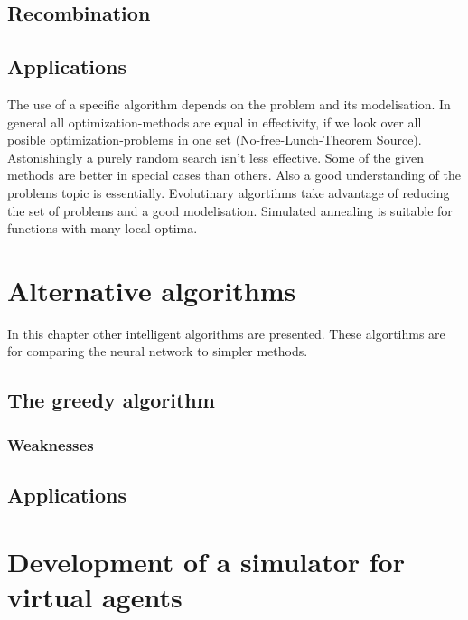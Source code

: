 \documentclass[10pt,a4paper,DIV=11]{scrreprt}
\begin{document}
\section{Recombination}



\section{Applications}
The use of a specific algorithm depends on the problem and its modelisation. In general all optimization-methods are equal in effectivity, if we look over all posible optimization-problems in one set (No-free-Lunch-Theorem Source). Astonishingly a purely random search isn't less effective.
Some of the given methods are better in special cases than others. Also a good understanding of the problems topic is essentially. Evolutinary algortihms take advantage of reducing the set of problems and a good modelisation.
Simulated annealing is suitable for functions with many local optima.


\chapter{Alternative algorithms}
In this chapter other intelligent algorithms are presented.
These algortihms are for comparing the neural network to simpler
methods.

\section{The greedy algorithm}

\subsection{Weaknesses}

\section{Applications}





\chapter{Development of a simulator for virtual agents}
\end{document}
